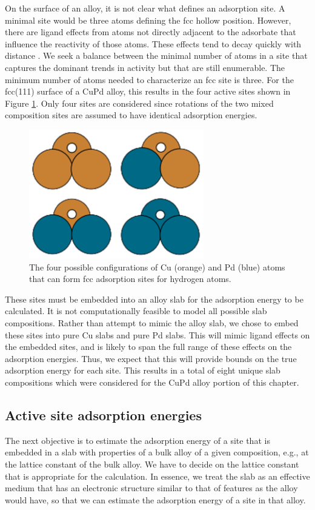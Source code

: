 \documentclass[12pt]{cmuthesis}
\begin{document}
On the surface of an alloy, it is not clear what defines an adsorption site. A minimal site would be three atoms defining the fcc hollow position. However, there are ligand effects from atoms not directly adjacent to the adsorbate that influence the reactivity of those atoms. These effects tend to decay quickly with distance \cite{inoglu-2010-new-solid}. We seek a balance between the minimal number of atoms in a site that captures the dominant trends in activity but that are still enumerable. The minimum number of atoms needed to characterize an fcc site is three. For the fcc(111) surface of a CuPd alloy, this results in the four active sites shown in Figure \ref{fig-configs}. Only four sites are considered since rotations of the two mixed composition sites are assumed to have identical adsorption energies.

\begin{figure}[h]
\centering
\includegraphics[width=3in]{./images/configs.png}
\caption{The four possible configurations of Cu (orange) and Pd (blue) atoms that can form fcc adsorption sites for hydrogen atoms. \label{fig-configs}}
\end{figure}

These sites must be embedded into an alloy slab for the adsorption energy to be calculated. It is not computationally feasible to model all possible slab compositions. Rather than attempt to mimic the alloy slab, we chose to embed these sites into pure Cu slabs and pure Pd slabs. This will mimic ligand effects on the embedded sites, and is likely to span the full range of these effects on the adsorption energies. Thus, we expect that this will provide bounds on the true adsorption energy for each site. This results in a total of eight unique slab compositions which were considered for the CuPd alloy portion of this chapter.

\subsection{Active site adsorption energies}
\label{sec:orgc6ca139}
The next objective is to estimate the adsorption energy of a site that is embedded in a slab with properties of a bulk alloy of a given composition, e.g., at the lattice constant of the bulk alloy. We have to decide on the lattice constant that is appropriate for the calculation. In essence, we treat the slab as an effective medium that has an electronic structure similar to that of features as the alloy would have, so that we can estimate the adsorption energy of a site in that alloy.
\end{document}
